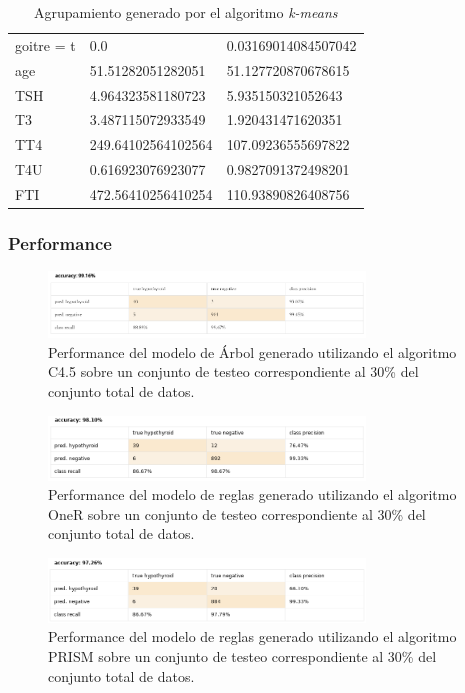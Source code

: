\documentclass[osajnl,twocolumn,showpacs,superscriptaddress,10pt,floatfix]{revtex4-1} %
\begin{document}
\begin{table}[ht]
\begin{tabular}{|l|l|l|}
        goitre = t & 0.0 & 0.03169014084507042 \\
        age & 51.51282051282051 & 51.127720870678615 \\
        TSH & 4.964323581180723 & 5.935150321052643 \\
        T3 & 3.487115072933549 & 1.920431471620351 \\
        TT4 & 249.64102564102564 & 107.09236555697822 \\
        T4U & 0.616923076923077 & 0.9827091372498201 \\
        FTI & 472.56410256410254 & 110.93890826408756 \\
        \hline
    \end{tabular}
    \caption{Agrupamiento generado por el algoritmo \textit{k-means}}
    \label{table:k_means_model}
\end{table}

\subsubsection{Performance} \label{apendix:models:performance}

\begin{figure}[h]
    \centering
    \includegraphics[width=0.75\textwidth]{models/w_j48_performance}
    \caption{Performance del modelo de Árbol generado utilizando el algoritmo C4.5 sobre un conjunto de testeo correspondiente al 30\% del conjunto total de datos.}
    \label{figure:w_j48_performance}
\end{figure}

\begin{figure}[h]
    \centering
    \includegraphics[width=0.75\textwidth]{models/w_oneR_performance}
    \caption{Performance del modelo de reglas generado utilizando el algoritmo OneR sobre un conjunto de testeo correspondiente al 30\% del conjunto total de datos.}
    \label{figure:w_oneR_performance}
\end{figure}

\begin{figure}[h]
    \centering
    \includegraphics[width=0.75\textwidth]{models/prism_performance}
    \caption{Performance del modelo de reglas generado utilizando el algoritmo PRISM sobre un conjunto de testeo correspondiente al 30\% del conjunto total de datos.}
    \label{figure:prism_performance}
\end{figure}
\end{document}
